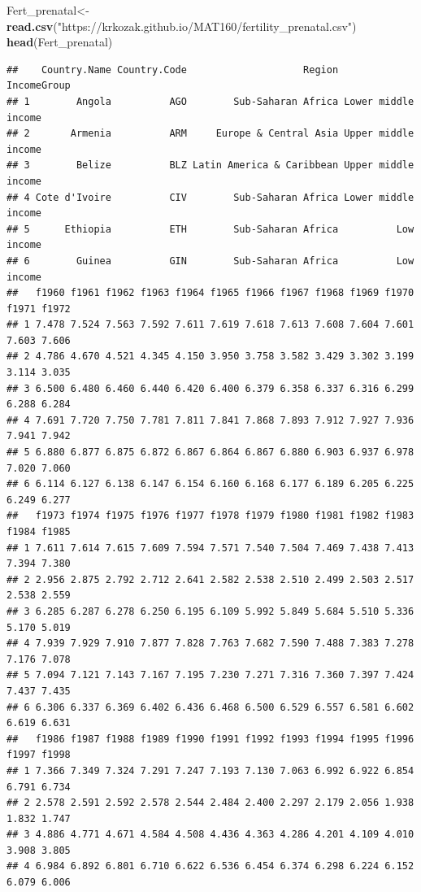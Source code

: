 \documentclass[
]{book}
\newenvironment{Shaded}{\begin{snugshade}}{\end{snugshade}}
\newcommand{\KeywordTok}[1]{\textcolor[rgb]{0.13,0.29,0.53}{\textbf{#1}}}
\newcommand{\NormalTok}[1]{#1}
\newcommand{\StringTok}[1]{\textcolor[rgb]{0.31,0.60,0.02}{#1}}
\begin{document}
\begin{Shaded}
\begin{Highlighting}[]
\NormalTok{Fert_prenatal<-}\StringTok{ }\KeywordTok{read.csv}\NormalTok{(}\StringTok{"https://krkozak.github.io/MAT160/fertility_prenatal.csv"}\NormalTok{)}
\KeywordTok{head}\NormalTok{(Fert_prenatal)}
\end{Highlighting}
\end{Shaded}

\begin{verbatim}
##    Country.Name Country.Code                    Region         IncomeGroup
## 1        Angola          AGO        Sub-Saharan Africa Lower middle income
## 2       Armenia          ARM     Europe & Central Asia Upper middle income
## 3        Belize          BLZ Latin America & Caribbean Upper middle income
## 4 Cote d'Ivoire          CIV        Sub-Saharan Africa Lower middle income
## 5      Ethiopia          ETH        Sub-Saharan Africa          Low income
## 6        Guinea          GIN        Sub-Saharan Africa          Low income
##   f1960 f1961 f1962 f1963 f1964 f1965 f1966 f1967 f1968 f1969 f1970 f1971 f1972
## 1 7.478 7.524 7.563 7.592 7.611 7.619 7.618 7.613 7.608 7.604 7.601 7.603 7.606
## 2 4.786 4.670 4.521 4.345 4.150 3.950 3.758 3.582 3.429 3.302 3.199 3.114 3.035
## 3 6.500 6.480 6.460 6.440 6.420 6.400 6.379 6.358 6.337 6.316 6.299 6.288 6.284
## 4 7.691 7.720 7.750 7.781 7.811 7.841 7.868 7.893 7.912 7.927 7.936 7.941 7.942
## 5 6.880 6.877 6.875 6.872 6.867 6.864 6.867 6.880 6.903 6.937 6.978 7.020 7.060
## 6 6.114 6.127 6.138 6.147 6.154 6.160 6.168 6.177 6.189 6.205 6.225 6.249 6.277
##   f1973 f1974 f1975 f1976 f1977 f1978 f1979 f1980 f1981 f1982 f1983 f1984 f1985
## 1 7.611 7.614 7.615 7.609 7.594 7.571 7.540 7.504 7.469 7.438 7.413 7.394 7.380
## 2 2.956 2.875 2.792 2.712 2.641 2.582 2.538 2.510 2.499 2.503 2.517 2.538 2.559
## 3 6.285 6.287 6.278 6.250 6.195 6.109 5.992 5.849 5.684 5.510 5.336 5.170 5.019
## 4 7.939 7.929 7.910 7.877 7.828 7.763 7.682 7.590 7.488 7.383 7.278 7.176 7.078
## 5 7.094 7.121 7.143 7.167 7.195 7.230 7.271 7.316 7.360 7.397 7.424 7.437 7.435
## 6 6.306 6.337 6.369 6.402 6.436 6.468 6.500 6.529 6.557 6.581 6.602 6.619 6.631
##   f1986 f1987 f1988 f1989 f1990 f1991 f1992 f1993 f1994 f1995 f1996 f1997 f1998
## 1 7.366 7.349 7.324 7.291 7.247 7.193 7.130 7.063 6.992 6.922 6.854 6.791 6.734
## 2 2.578 2.591 2.592 2.578 2.544 2.484 2.400 2.297 2.179 2.056 1.938 1.832 1.747
## 3 4.886 4.771 4.671 4.584 4.508 4.436 4.363 4.286 4.201 4.109 4.010 3.908 3.805
## 4 6.984 6.892 6.801 6.710 6.622 6.536 6.454 6.374 6.298 6.224 6.152 6.079 6.006

\end{verbatim}
\end{document}
